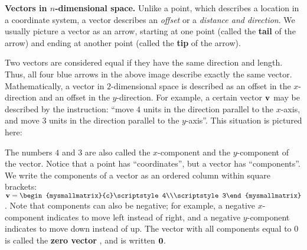 \noindent\textbf{Vectors in $n$-dimensional space.}
Unlike a point, which describes a location in a coordinate system, a
vector%
 describes an {\em offset}%
 or a {\em distance and direction}. We usually picture a
vector as an arrow, starting at one point (called the \textbf{tail}%
%
 of the arrow) and ending at another point (called
the \textbf{tip}%
%
 of the arrow).
\begin{center}
\end{center}
Two vectors are considered equal if they have the same direction and
length. Thus, all four blue arrows in the above image describe exactly
the same vector. Mathematically, a vector in $2$-dimensional space is
described as an offset in the $x$-direction and an offset in the
$y$-direction.  For example, a certain vector $\vect{v}$ may be
described by the instruction: ``move $4$ units in the direction
parallel to the $x$-axis, and move $3$ units in the direction parallel
to the $y$-axis''. This situation is pictured here:
\begin{center}
\end{center}
The numbers $4$ and $3$ are also called the $x$-component%
 and the $y$-component of the
vector. Notice that a point has ``coordinates'', but a vector has
``components''. We write the components of a vector as an ordered
column within square brackets:
$\vect{v}=\begin{mysmallmatrix}{c}\scriptstyle4\\\scriptstyle3\end{mysmallmatrix}$. Note
that components can also be negative; for example, a negative
$x$-component indicates to move left instead of right, and a negative
$y$-component indicates to move down instead of up. The vector with
all components equal to $0$ is called the \textbf{zero vector}%
, and is written $\vect{0}$.

